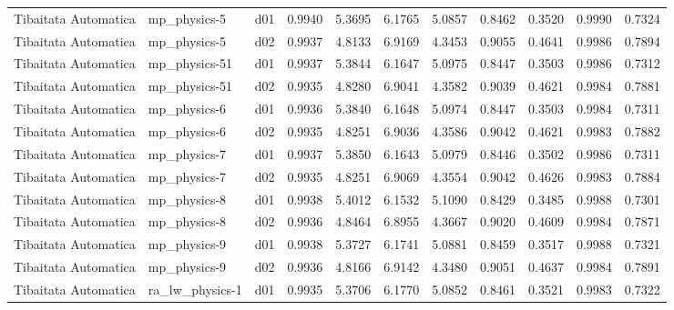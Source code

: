 \begin{longtable}{lllrrrrrrrr}
 Tibaitata Automatica  &          mp\_physics-5 &     d01 &   0.9940 &   5.3695 &   6.1765 &       5.0857 &        0.8462 &       0.3520 &           0.9990 &  0.7324 \\
 Tibaitata Automatica  &          mp\_physics-5 &     d02 &   0.9937 &   4.8133 &   6.9169 &       4.3453 &        0.9055 &       0.4641 &           0.9986 &  0.7894 \\
 Tibaitata Automatica  &         mp\_physics-51 &     d01 &   0.9937 &   5.3844 &   6.1647 &       5.0975 &        0.8447 &       0.3503 &           0.9986 &  0.7312 \\
 Tibaitata Automatica  &         mp\_physics-51 &     d02 &   0.9935 &   4.8280 &   6.9041 &       4.3582 &        0.9039 &       0.4621 &           0.9984 &  0.7881 \\
 Tibaitata Automatica  &          mp\_physics-6 &     d01 &   0.9936 &   5.3840 &   6.1648 &       5.0974 &        0.8447 &       0.3503 &           0.9984 &  0.7311 \\
 Tibaitata Automatica  &          mp\_physics-6 &     d02 &   0.9935 &   4.8251 &   6.9036 &       4.3586 &        0.9042 &       0.4621 &           0.9983 &  0.7882 \\
 Tibaitata Automatica  &          mp\_physics-7 &     d01 &   0.9937 &   5.3850 &   6.1643 &       5.0979 &        0.8446 &       0.3502 &           0.9986 &  0.7311 \\
 Tibaitata Automatica  &          mp\_physics-7 &     d02 &   0.9935 &   4.8251 &   6.9069 &       4.3554 &        0.9042 &       0.4626 &           0.9983 &  0.7884 \\
 Tibaitata Automatica  &          mp\_physics-8 &     d01 &   0.9938 &   5.4012 &   6.1532 &       5.1090 &        0.8429 &       0.3485 &           0.9988 &  0.7301 \\
 Tibaitata Automatica  &          mp\_physics-8 &     d02 &   0.9936 &   4.8464 &   6.8955 &       4.3667 &        0.9020 &       0.4609 &           0.9984 &  0.7871 \\
 Tibaitata Automatica  &          mp\_physics-9 &     d01 &   0.9938 &   5.3727 &   6.1741 &       5.0881 &        0.8459 &       0.3517 &           0.9988 &  0.7321 \\
 Tibaitata Automatica  &          mp\_physics-9 &     d02 &   0.9936 &   4.8166 &   6.9142 &       4.3480 &        0.9051 &       0.4637 &           0.9984 &  0.7891 \\
 Tibaitata Automatica  &       ra\_lw\_physics-1 &     d01 &   0.9935 &   5.3706 &   6.1770 &       5.0852 &        0.8461 &       0.3521 &           0.9983 &  0.7322 \\

\end{longtable}
